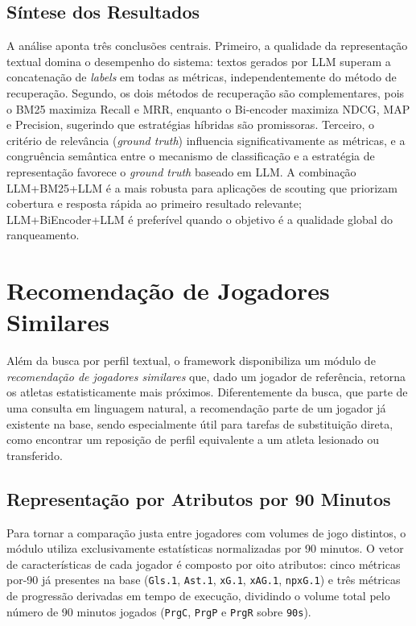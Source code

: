 \documentclass[portuguese]{sbc2025}
\begin{document}
\subsection{Síntese dos Resultados}

A análise aponta três conclusões centrais. Primeiro, a qualidade da representação
textual domina o desempenho do sistema: textos gerados por LLM superam a concatenação
de \textit{labels} em todas as métricas, independentemente do método de recuperação.
Segundo, os dois métodos de recuperação são complementares, pois o BM25 maximiza
Recall e MRR, enquanto o Bi-encoder maximiza NDCG, MAP e Precision, sugerindo que
estratégias híbridas são promissoras. Terceiro, o critério de relevância
(\textit{ground truth}) influencia significativamente as métricas, e a congruência
semântica entre o mecanismo de classificação e a estratégia de representação favorece
o \textit{ground truth} baseado em LLM. A combinação LLM+BM25+LLM é a mais robusta
para aplicações de scouting que priorizam cobertura e resposta rápida ao primeiro
resultado relevante; LLM+BiEncoder+LLM é preferível quando o objetivo é a
qualidade global do ranqueamento.

\section{Recomendação de Jogadores Similares}
\label{sec:recomendacao}

Além da busca por perfil textual, o framework disponibiliza um módulo de
\emph{recomendação de jogadores similares} que, dado um jogador de referência,
retorna os atletas estatisticamente mais próximos. Diferentemente da busca, que
parte de uma consulta em linguagem natural, a recomendação parte de um jogador
já existente na base, sendo especialmente útil para tarefas de substituição
direta, como encontrar um reposição de perfil equivalente a um atleta lesionado
ou transferido.

\subsection{Representação por Atributos por 90 Minutos}
Para tornar a comparação justa entre jogadores com volumes de jogo distintos,
o módulo utiliza exclusivamente estatísticas normalizadas por 90 minutos. O
vetor de características de cada jogador é composto por oito atributos: cinco
métricas por-90 já presentes na base (\texttt{Gls.1}, \texttt{Ast.1},
\texttt{xG.1}, \texttt{xAG.1}, \texttt{npxG.1}) e três métricas de progressão
derivadas em tempo de execução, dividindo o volume total pelo número de 90
minutos jogados (\texttt{PrgC}, \texttt{PrgP} e \texttt{PrgR} sobre \texttt{90s}).
\end{document}

